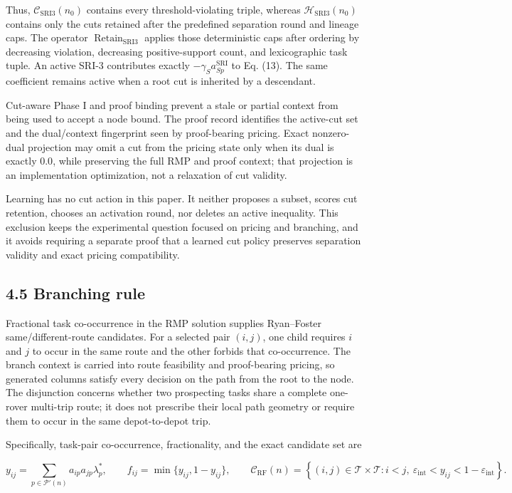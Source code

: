\documentclass[
  11pt,
]{article}
\begin{document}
Thus, \(\mathcal{C}_{\mathrm{SRI3}}(n_0)\) contains every
threshold-violating triple, whereas \(\mathcal{H}_{\mathrm{SRI3}}(n_0)\)
contains only the cuts retained after the predefined separation round
and lineage caps. The operator \(\operatorname{Retain}_{\mathrm{SRI3}}\)
applies those deterministic caps after ordering by decreasing violation,
decreasing positive-support count, and lexicographic task tuple. An
active SRI-3 contributes exactly \(-\gamma_Sa_{Sp}^{\mathrm{SRI}}\) to
Eq. (13). The same coefficient remains active when a root cut is
inherited by a descendant.

Cut-aware Phase I and proof binding prevent a stale or partial context
from being used to accept a node bound. The proof record identifies the
active-cut set and the dual/context fingerprint seen by proof-bearing
pricing. Exact nonzero-dual projection may omit a cut from the pricing
state only when its dual is exactly \(0.0\), while preserving the full
RMP and proof context; that projection is an implementation
optimization, not a relaxation of cut validity.

Learning has no cut action in this paper. It neither proposes a subset,
scores cut retention, chooses an activation round, nor deletes an active
inequality. This exclusion keeps the experimental question focused on
pricing and branching, and it avoids requiring a separate proof that a
learned cut policy preserves separation validity and exact pricing
compatibility.

\hypertarget{branching-rule}{%
\subsection{4.5 Branching rule}\label{branching-rule}}

Fractional task co-occurrence in the RMP solution supplies Ryan--Foster
same/different-route candidates. For a selected pair \((i,j)\), one
child requires \(i\) and \(j\) to occur in the same route and the other
forbids that co-occurrence. The branch context is carried into route
feasibility and proof-bearing pricing, so generated columns satisfy
every decision on the path from the root to the node. The disjunction
concerns whether two prospecting tasks share a complete one-rover
multi-trip route; it does not prescribe their local path geometry or
require them to occur in the same depot-to-depot trip.

Specifically, task-pair co-occurrence, fractionality, and the exact
candidate set are

\[
y_{ij}=\sum_{p\in\mathcal{P}'(n)}a_{ip}a_{jp}\lambda_p^*,
\qquad
f_{ij}=\min\{y_{ij},1-y_{ij}\},
\qquad
\mathcal{C}_{\mathrm{RF}}(n)
=
\left\{(i,j)\in\mathcal{T}\times\mathcal{T}:
i<j,\
\varepsilon_{\mathrm{int}}<y_{ij}<1-\varepsilon_{\mathrm{int}}
\right\}.
\tag{22}
\]
\end{document}

